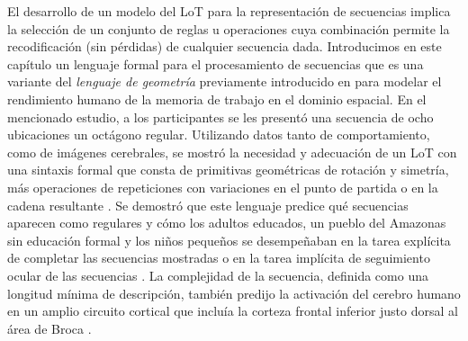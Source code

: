 
El desarrollo de un modelo del LoT para la representación de secuencias implica la selección de un conjunto de reglas u operaciones cuya combinación permite la recodificación (sin pérdidas) de cualquier secuencia dada. Introducimos en este capítulo un lenguaje formal para el procesamiento de secuencias que es una variante del \textit{lenguaje de geometría} previamente introducido en \cite{amalric2017language} para modelar el rendimiento humano de la memoria de trabajo en el dominio espacial. En el mencionado estudio, a los participantes se les presentó una secuencia de ocho ubicaciones un octágono regular. Utilizando datos tanto de comportamiento, como de imágenes cerebrales, se mostró la necesidad y adecuación de un LoT con una sintaxis formal que consta de primitivas geométricas de rotación y simetría, más operaciones de repeticiones con variaciones en el punto de partida o en la cadena resultante \cite{romano2018bayesian,amalric2017language,f59,f60}. Se demostró que este lenguaje predice qué secuencias aparecen como regulares y cómo los adultos educados, un pueblo del Amazonas sin educación formal y los niños pequeños se desempeñaban en la tarea explícita de completar las secuencias mostradas \cite{amalric2017language} o en la tarea implícita de seguimiento ocular de las secuencias \cite{f60}. La complejidad de la secuencia, definida como una longitud mínima de descripción, también predijo la activación del cerebro humano en un amplio circuito cortical que incluía la corteza frontal inferior justo dorsal al área de Broca \cite{f60}.

